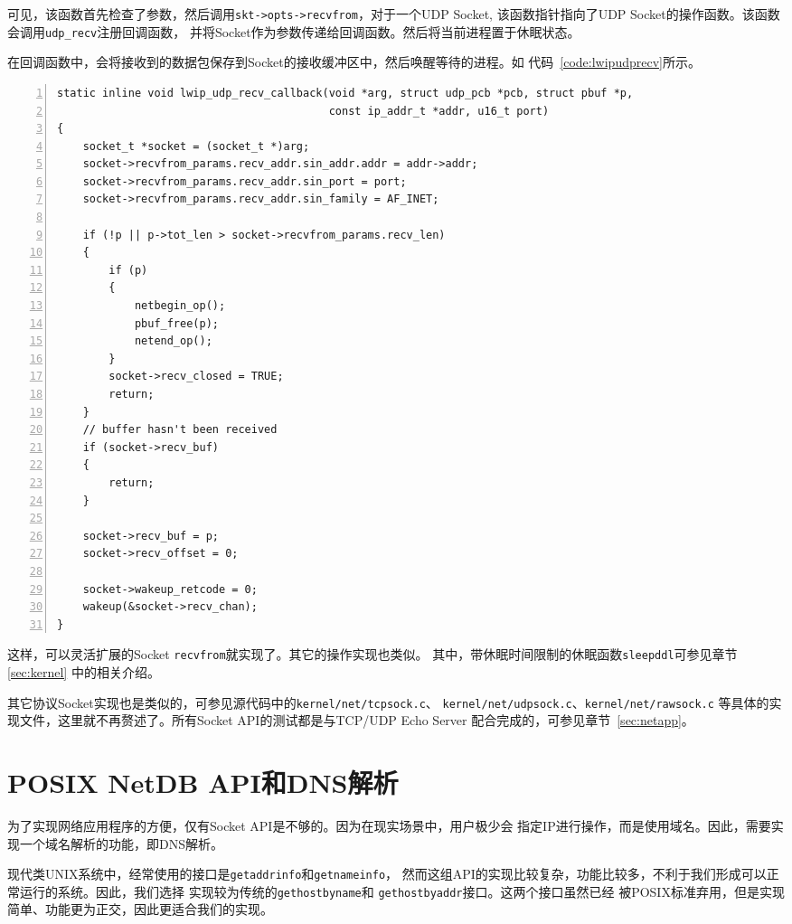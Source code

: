 \documentclass[a4paper,twoside]{ctexrep}
\begin{document}
\begin{spacing}{1.2}
可见，该函数首先检查了参数，然后调用\texttt{skt->opts->recvfrom}，对于一个UDP Socket,
该函数指针指向了UDP Socket的操作函数。该函数会调用\texttt{udp\_recv}注册回调函数，
并将Socket作为参数传递给回调函数。然后将当前进程置于休眠状态。

在回调函数中，会将接收到的数据包保存到Socket的接收缓冲区中，然后唤醒等待的进程。如
代码~\ref{code:lwipudprecv}所示。
\begin{lstlisting}[numbers=left,style=CppStyle,caption={LWIP的接受回调},label={code:lwipudprecv}]
static inline void lwip_udp_recv_callback(void *arg, struct udp_pcb *pcb, struct pbuf *p,
										  const ip_addr_t *addr, u16_t port)
{
	socket_t *socket = (socket_t *)arg;
	socket->recvfrom_params.recv_addr.sin_addr.addr = addr->addr;
	socket->recvfrom_params.recv_addr.sin_port = port;
	socket->recvfrom_params.recv_addr.sin_family = AF_INET;

	if (!p || p->tot_len > socket->recvfrom_params.recv_len)
	{
		if (p)
		{
			netbegin_op();
			pbuf_free(p);
			netend_op();
		}
		socket->recv_closed = TRUE;
		return;
	}
	// buffer hasn't been received
	if (socket->recv_buf)
	{
		return;
	}

	socket->recv_buf = p;
	socket->recv_offset = 0;

	socket->wakeup_retcode = 0;
	wakeup(&socket->recv_chan);
}
\end{lstlisting}


这样，可以灵活扩展的Socket \texttt{recvfrom}就实现了。其它的操作实现也类似。
其中，带休眠时间限制的休眠函数\texttt{sleepddl}可参见章节\ref{sec:kernel}
中的相关介绍。

其它协议Socket实现也是类似的，可参见源代码中的\texttt{kernel/net/tcpsock.c}、
\texttt{kernel/net/udpsock.c}、\texttt{kernel/net/rawsock.c}
等具体的实现文件，这里就不再赘述了。所有Socket API的测试都是与TCP/UDP Echo Server
配合完成的，可参见章节~\ref{sec:netapp}。

\section{POSIX NetDB API和DNS解析}

为了实现网络应用程序的方便，仅有Socket API是不够的。因为在现实场景中，用户极少会
指定IP进行操作，而是使用域名。因此，需要实现一个域名解析的功能，即DNS解析\cite{mockapetris1987rfc1035}。

现代类UNIX系统中，经常使用的接口是\texttt{getaddrinfo}和\texttt{getnameinfo}，
然而这组API的实现比较复杂，功能比较多，不利于我们形成可以正常运行的系统。因此，我们选择
实现较为传统的\texttt{gethostbyname}和
\texttt{gethostbyaddr}接口。这两个接口虽然已经
被POSIX标准弃用，但是实现简单、功能更为正交，因此更适合我们的实现。


\end{spacing}
\end{document}
